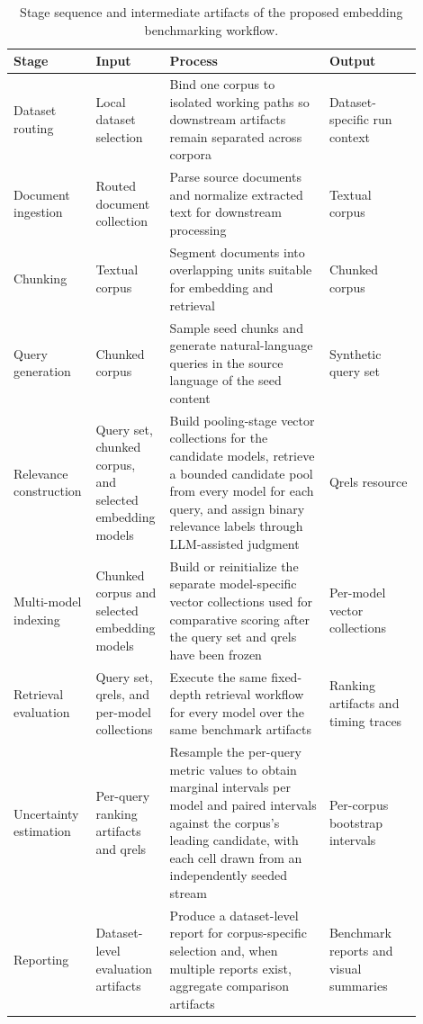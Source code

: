 \begin{table}[htbp]
\caption{Stage sequence and intermediate artifacts of the proposed embedding benchmarking workflow.}\label{tbl:method_pipeline_stages}
\centering
\small
\begin{tabular}{@{}>{\raggedright\arraybackslash}p{0.14\linewidth}>{\raggedright\arraybackslash}p{0.16\linewidth}>{\raggedright\arraybackslash}p{0.38\linewidth}>{\raggedright\arraybackslash}p{0.22\linewidth}@{}}
\toprule
Stage & Input & Process & Output \\
\midrule
Dataset routing & Local dataset selection & Bind one corpus to isolated working paths so downstream artifacts remain separated across corpora & Dataset-specific run context \\
Document ingestion & Routed document collection & Parse source documents and normalize extracted text for downstream processing & Textual corpus \\
Chunking & Textual corpus & Segment documents into overlapping units suitable for embedding and retrieval & Chunked corpus \\
Query generation & Chunked corpus & Sample seed chunks and generate natural-language queries in the source language of the seed content & Synthetic query set \\
Relevance construction & Query set, chunked corpus, and selected embedding models & Build pooling-stage vector collections for the candidate models, retrieve a bounded candidate pool from every model for each query, and assign binary relevance labels through LLM-assisted judgment & Qrels resource \\
Multi-model indexing & Chunked corpus and selected embedding models & Build or reinitialize the separate model-specific vector collections used for comparative scoring after the query set and qrels have been frozen & Per-model vector collections \\
Retrieval evaluation & Query set, qrels, and per-model collections & Execute the same fixed-depth retrieval workflow for every model over the same benchmark artifacts & Ranking artifacts and timing traces \\
Uncertainty estimation & Per-query ranking artifacts and qrels & Resample the per-query metric values to obtain marginal intervals per model and paired intervals against the corpus's leading candidate, with each cell drawn from an independently seeded stream & Per-corpus bootstrap intervals \\
Reporting & Dataset-level evaluation artifacts & Produce a dataset-level report for corpus-specific selection and, when multiple reports exist, aggregate comparison artifacts & Benchmark reports and visual summaries \\
\bottomrule
\end{tabular}
\end{table}

